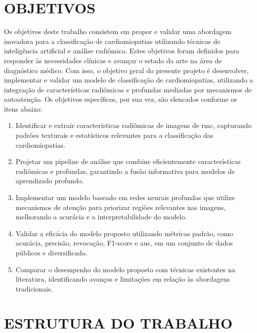 \section{OBJETIVOS}
\label{sec:cap1_objetivo}

Os objetivos deste trabalho consistem em propor e validar uma abordagem inovadora para a classificação de cardiomiopatias utilizando técnicas de inteligência artificial e análise radiômica. Estes objetivos foram definidos para responder às necessidades clínicas e avançar o estado da arte na área de diagnóstico médico. Com isso, o objetivo geral do presente projeto é desenvolver, implementar e validar um modelo de classificação de cardiomiopatias, utilizando a integração de características radiômicas e profundas mediadas por mecanismos de autoatenção. Os objetivos específicos, por sua vez, são elencados conforme os itens abaixo:


\begin{enumerate}
\item Identificar e extrair características radiômicas de imagens de \gls{rmc}, capturando padrões texturais e estatísticos relevantes para a classificação das cardiomiopatias.

\item Projetar um pipeline de análise que combine eficientemente características radiômicas e profundas, garantindo a fusão informativa para modelos de aprendizado profundo.

\item Implementar um modelo baseado em redes neurais profundas que utilize mecanismos de atenção para priorizar regiões relevantes nas imagens, melhorando a acurácia e a interpretabilidade do modelo.

\item Validar a eficácia do modelo proposto utilizando métricas padrão, como acurácia, precisão, revocação, F1-score e \gls{auc}, em um conjunto de dados públicos e diversificado.

\item Comparar o desempenho do modelo proposto com técnicas existentes na literatura, identificando avanços e limitações em relação às abordagens tradicionais.
\end{enumerate}

\section{ESTRUTURA DO TRABALHO}
\label{sec:cap1_estrutura_trabalho}

